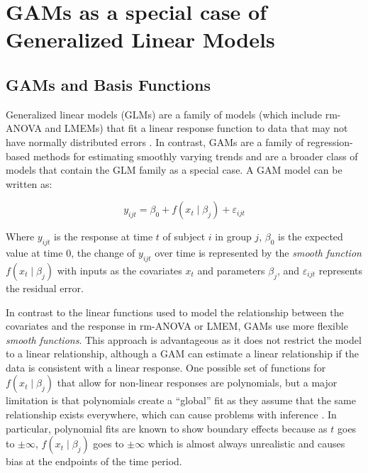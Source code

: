 \documentclass[Royal,times,doublespace,sagev]{sagej}
\begin{document}
\hypertarget{GAM-theory}{%
\section{GAMs as a special case of Generalized Linear Models}\label{GAM-theory}}

\hypertarget{gams-and-basis-functions}{%
\subsection{GAMs and Basis Functions}\label{gams-and-basis-functions}}

Generalized linear models (GLMs) are a family of models (which include rm-ANOVA and LMEMs) that fit a linear response function to data that may not have normally distributed errors \cite{nelder1972}. In contrast, GAMs are a family of regression-based methods for estimating smoothly varying trends and are a broader class of models that contain the GLM family as a special case\cite{simpson2018, wood2017, hastie1987}. A GAM model can be written as:

\begin{equation}
  y_{ijt}=\beta_0+f(x_t\mid \beta_j)+\varepsilon_{ijt}
  \label{eq:GAM}
\end{equation}

Where \(y_{ijt}\) is the response at time \(t\) of subject \(i\) in group \(j\), \(\beta_0\) is the expected value at time 0, the change of \(y_{ijt}\) over time is represented by the \emph{smooth function} \(f(x_t\mid \beta_j)\) with inputs as the covariates \(x_t\) and parameters \(\beta_j\), and \(\varepsilon_{ijt}\) represents the residual error.

In contrast to the linear functions used to model the relationship between the covariates and the response in rm-ANOVA or LMEM, GAMs use more flexible \emph{smooth functions}. This approach is advantageous as it does not restrict the model to a linear relationship, although a GAM can estimate a linear relationship if the data is consistent with a linear response. One possible set of functions for \(f(x_t\mid \beta_j)\) that allow for non-linear responses are polynomials, but a major limitation is that polynomials create a ``global'' fit as they assume that the same relationship exists everywhere, which can cause problems with inference \cite{beck1998}. In particular, polynomial fits are known to show boundary effects because as \(t\) goes to \(\pm \infty\), \(f(x_t \mid \beta_j)\) goes to \(\pm \infty\) which is almost always unrealistic and causes bias at the endpoints of the time period.
\end{document}
